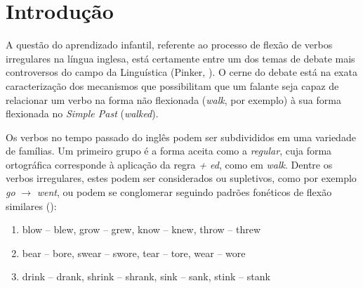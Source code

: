 \chapter{Introdução}
\label{ch:01}

A questão do aprendizado infantil, referente ao processo de flexão de verbos irregulares na língua inglesa, está certamente entre um dos temas de debate mais controversos %
do campo da Linguística (Pinker, \citeyear{Pinker:1999}). O cerne do debate está na exata caracterização dos mecanismos que possibilitam que um falante seja capaz de relacionar um verbo na forma não flexionada (\textit{walk}, por exemplo) à sua forma flexionada no \textit{Simple Past} (\textit{walked}).

Os verbos no tempo passado do inglês podem ser subdivididos em uma variedade de famílias. Um primeiro grupo é a forma aceita como a \textit{regular}, cuja forma ortográfica corresponde à aplicação da regra \textit{ + ed}, como em \textit{walk}. %
Dentre os verbos irregulares, estes podem ser considerados ou supletivos, como por exemplo \textit{go} $\rightarrow$ \textit{went}, ou podem se conglomerar seguindo padrões fonéticos de flexão similares (\cite{Nelson:2010}):

\begin{enumerate}
    \item blow – blew, grow – grew, know – knew, throw – threw
    \item bear – bore, swear – swore, tear – tore, wear – wore
    \item drink – drank, shrink – shrank, sink – sank, stink – stank 
\end{enumerate}

